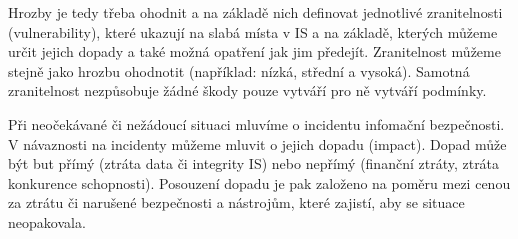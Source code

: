 \documentclass{szzclass}
\begin{document}
Hrozby je tedy třeba ohodnit a na základě nich definovat jednotlivé zranitelnosti (vulnerability), které ukazují na slabá místa v IS a na
základě, kterých můžeme určit jejich dopady a také možná opatření jak jim předejít. Zranitelnost můžeme stejně jako hrozbu ohodnotit
(například: nízká, střední a vysoká). Samotná zranitelnost nezpůsobuje žádné škody pouze vytváří pro ně vytváří podmínky.

Při neočekávané či nežádoucí situaci mluvíme o incidentu infomační bezpečnosti. V návaznosti na incidenty můžeme mluvit o jejich dopadu (impact).
Dopad může být but přímý (ztráta data či integrity IS) nebo nepřímý (finanční ztráty, ztráta konkurence schopnosti). Posouzení dopadu je pak založeno
na poměru mezi cenou za ztrátu či narušené bezpečnosti a nástrojům, které zajistí, aby se situace neopakovala.
\end{document}
